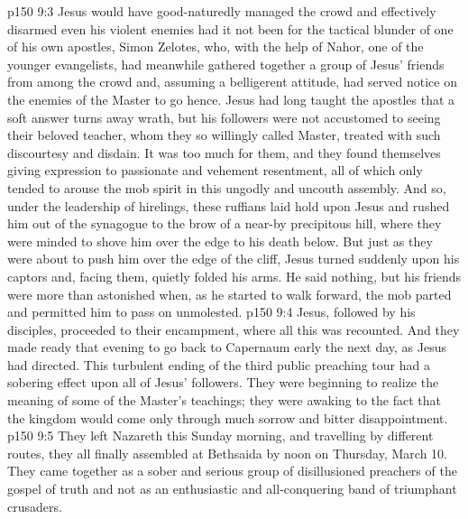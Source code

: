 \vs p150 9:3 Jesus would have good\hyp{}naturedly managed the crowd and effectively disarmed even his violent enemies had it not been for the tactical blunder of one of his own apostles, Simon Zelotes, who, with the help of Nahor, one of the younger evangelists, had meanwhile gathered together a group of Jesus’ friends from among the crowd and, assuming a belligerent attitude, had served notice on the enemies of the Master to go hence. Jesus had long taught the apostles that a soft answer turns away wrath, but his followers were not accustomed to seeing their beloved teacher, whom they so willingly called Master, treated with such discourtesy and disdain. It was too much for them, and they found themselves giving expression to passionate and vehement resentment, all of which only tended to arouse the mob spirit in this ungodly and uncouth assembly. And so, under the leadership of hirelings, these ruffians laid hold upon Jesus and rushed him out of the synagogue to the brow of a near-by precipitous hill, where they were minded to shove him over the edge to his death below. But just as they were about to push him over the edge of the cliff, Jesus turned suddenly upon his captors and, facing them, quietly folded his arms. He said nothing, but his friends were more than astonished when, as he started to walk forward, the mob parted and permitted him to pass on unmolested.
\vs p150 9:4 Jesus, followed by his disciples, proceeded to their encampment, where all this was recounted. And they made ready that evening to go back to Capernaum early the next day, as Jesus had directed. This turbulent ending of the third public preaching tour had a sobering effect upon all of Jesus’ followers. They were beginning to realize the meaning of some of the Master’s teachings; they were awaking to the fact that the kingdom would come only through much sorrow and bitter disappointment.
\vs p150 9:5 They left Nazareth this Sunday morning, and travelling by different routes, they all finally assembled at Bethsaida by noon on Thursday, March 10. They came together as a sober and serious group of disillusioned preachers of the gospel of truth and not as an enthusiastic and all\hyp{}conquering band of triumphant crusaders.
\quizlink
